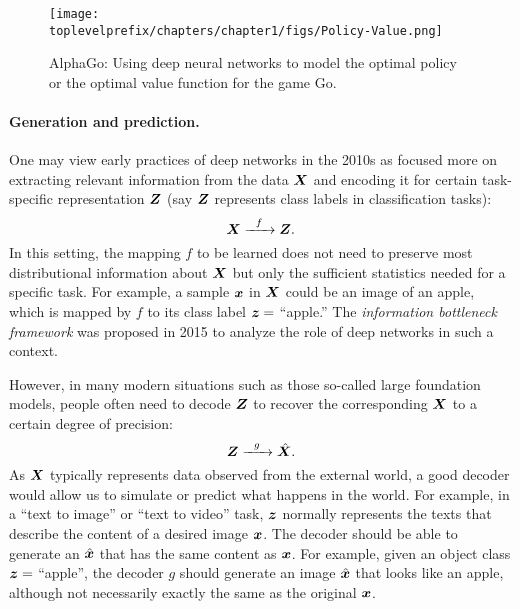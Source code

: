 \documentclass[../../book-main.tex]{subfiles}
\begin{document}
\begin{figure}
    \centering
    \texttt{[image: \\toplevelprefix/chapters/chapter1/figs/Policy-Value.png]}
    \caption{AlphaGo: Using deep neural networks to model the optimal policy or the optimal value function for the game Go. }
    \label{fig:Alpha-Go}
\end{figure}

\paragraph{Generation and prediction.}
One may view early practices of deep networks in the 2010s as focused more on extracting relevant information from the data $\bm{X}$ and encoding it for certain task-specific representation $\bm{Z}$ (say $\bm{Z}$ represents class labels in classification tasks):
\begin{equation}
    \bm{X}   \xrightarrow{\hspace{2mm} f \hspace{2mm}} \bm{Z}.
       \label{eqn:encoding-deep-networks}
\end{equation}
In this setting, the mapping $f$ to be learned does not need to preserve most distributional information about $\bm{X}$ but only the sufficient statistics needed for a specific task. For example, a sample $\bm{x}$ in $\bm{X}$ could be an image of an apple, which is mapped by $f$ to its class label $\bm{z} =$ ``apple.'' The {\em information bottleneck framework} \cite{Tishby-ITW2015} was proposed in 2015 to analyze the role of deep networks in such a context.
 
However, in many modern situations such as those so-called large foundation models, people often need to decode $\bm{Z}$ to recover the corresponding $\bm{X}$ to a certain degree of precision:
\begin{equation}
    \bm{Z}   \xrightarrow{\hspace{2mm} g  \hspace{2mm}} \hat {\bm{X}}.
       \label{eqn:decoding-deep-networks}
\end{equation}
As $\bm{X}$ typically represents data observed from the external world, a good decoder would allow us to simulate or predict what happens in the world. For example, in a ``text to image'' or ``text to video'' task, $\bm{z}$ normally represents the texts that describe the content of a desired image $\bm{x}$. The decoder should be able to generate an $\hat {\bm{x}}$ that has the same content as $\bm{x}$. For example, given an object class $\bm{z} = $ ``apple'', the decoder $g$ should generate an image $\hat {\bm{x}}$ that looks like an apple, although not necessarily exactly the same as the original $\bm{x}$. 
\end{document}
